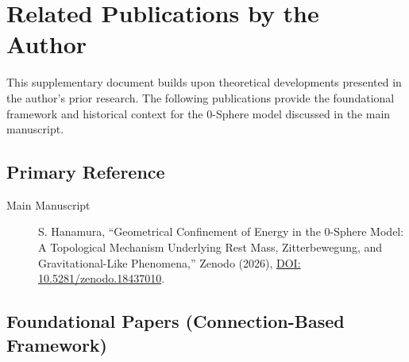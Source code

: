 \documentclass[12pt,letterpaper]{article}
\begin{document}

\section*{Related Publications by the Author}

This supplementary document builds upon theoretical developments presented in the author's prior research. The following publications provide the foundational framework and historical context for the 0-Sphere model discussed in the main manuscript.

\subsection*{Primary Reference}

\begin{description}
\item[Main Manuscript] S. Hanamura, ``Geometrical Confinement of Energy in the 0-Sphere Model: A Topological Mechanism Underlying Rest Mass, Zitterbewegung, and Gravitational-Like Phenomena,'' Zenodo (2026), \href{https://doi.org/10.5281/zenodo.18437010}{DOI: 10.5281/zenodo.18437010}.
\end{description}

\subsection*{Foundational Papers (Connection-Based Framework)}
\end{document}
